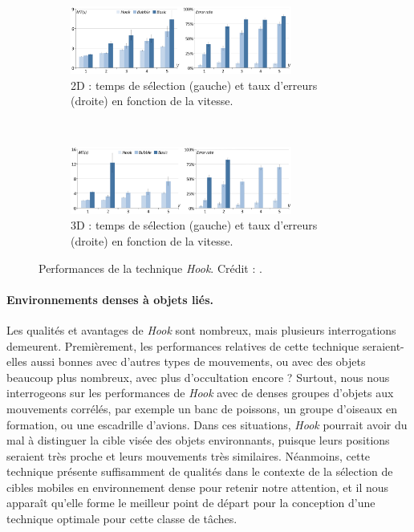 	\begin{figure}[htbp]
		\begin{subfigure}{\textwidth}
			\centering
			\includegraphics[width=0.8\textwidth]{figures/ch2/hookRes2d}
			\caption[\emph{Hook} -- performances en 2D]{2D : temps de sélection (gauche) et taux d'erreurs (droite) en fonction de la vitesse.}
			\label{fig:hookRes2d}
		\end{subfigure}
		~
		\begin{subfigure}{\textwidth}
			\centering
			\includegraphics[width=0.8\textwidth]{figures/ch2/hookRes3d}
			\caption[\emph{Hook} -- performances en 2D]{3D : temps de sélection (gauche) et taux d'erreurs (droite) en fonction de la vitesse.}
			\label{fig:hookRes3d}
		\end{subfigure}
		\caption[\emph{Hook} -- Performances]{Performances de la technique \emph{Hook}. Crédit : \cite{ortega2013hook}.}
	\end{figure}
	
	\paragraph{Environnements denses à objets liés.}
	Les qualités et avantages de \emph{Hook} sont nombreux, mais plusieurs interrogations demeurent. Premièrement, les performances relatives de cette technique seraient-elles aussi bonnes avec d'autres types de mouvements, ou avec des objets beaucoup plus nombreux, avec plus d'occultation encore ? Surtout, nous nous interrogeons sur les performances de \emph{Hook} avec de denses groupes d'objets aux mouvements corrélés, par exemple un banc de poissons, un groupe d'oiseaux en formation, ou une escadrille d'avions. Dans ces situations, \emph{Hook} pourrait avoir du mal à distinguer la cible visée des objets environnants, puisque leurs positions seraient très proche et leurs mouvements très similaires. Néanmoins, cette technique présente suffisamment de qualités dans le contexte de la sélection de cibles mobiles en environnement dense pour retenir notre attention, et il nous apparaît qu'elle forme le meilleur point de départ pour la conception d'une technique optimale pour cette classe de tâches.
	
